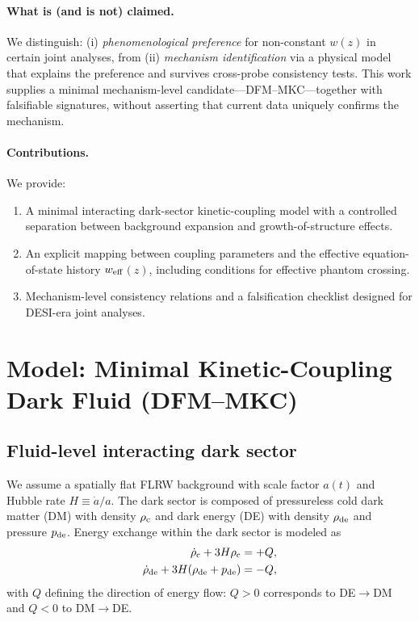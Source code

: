 \documentclass[11pt]{article}
\newcommand{\wz}{\ensuremath{w(z)}\xspace}
\newcommand{\weff}{\ensuremath{w_{\rm eff}}\xspace}
\begin{document}
\paragraph{What is (and is not) claimed.}
We distinguish: (i) \emph{phenomenological preference} for non-constant \wz in certain joint analyses, from (ii) \emph{mechanism identification} via a physical model that explains the preference and survives cross-probe consistency tests.
This work supplies a minimal mechanism-level candidate---DFM--MKC---together with falsifiable signatures,
without asserting that current data uniquely confirms the mechanism.

\paragraph{Contributions.}
We provide:
\begin{enumerate}
  \item A minimal interacting dark-sector kinetic-coupling model with a controlled separation between background expansion and growth-of-structure effects.
  \item An explicit mapping between coupling parameters and the effective equation-of-state history \weff$(z)$, including conditions for effective phantom crossing.
  \item Mechanism-level consistency relations and a falsification checklist designed for DESI-era joint analyses.
\end{enumerate}
\cite{DESI,Planck2018,PantheonPlus}

\section{Model: Minimal Kinetic-Coupling Dark Fluid (DFM--MKC)}
\label{sec:model}

\subsection{Fluid-level interacting dark sector}

We assume a spatially flat FLRW background with scale factor $a(t)$ and Hubble rate $H\equiv \dot a/a$.
The dark sector is composed of pressureless cold dark matter (DM) with density $\rho_{\rm c}$ and dark energy (DE) with density $\rho_{\rm de}$ and pressure $p_{\rm de}$.
Energy exchange within the dark sector is modeled as
\begin{align}
\dot\rho_{\rm c} + 3H\rho_{\rm c} &= +Q, \label{eq:dm_cont}\\
\dot\rho_{\rm de} + 3H(\rho_{\rm de}+p_{\rm de}) &= -Q, \label{eq:de_cont}
\end{align}
with $Q$ defining the direction of energy flow:
$Q>0$ corresponds to DE$\to$DM and $Q<0$ to DM$\to$DE.
\end{document}
